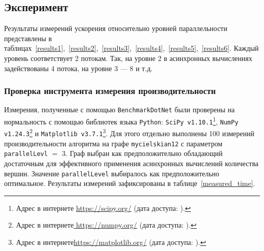 \subsection{Эксперимент}
\noindent Результаты измерений ускорения относительно уровней параллельности представлены в таблицах~\ref{results1},~\ref{results2},~\ref{results3},~\ref{results4},~\ref{results5},~\ref{results6}. Каждый уровень соответствует 2 потокам. Так, на уровне 2 в асинхронных вычислениях задействованы 4 потока, на уровне 3 --- 8 и т.д. 

\subsubsection*{Проверка инструмента измерения производительности}
\noindent  Измерения, полученные с помощью \texttt{BenchmarkDotNet} были проверены на нормальность с помощью библиотек языка \texttt{Python}: \texttt{SciPy v1.10.1}\footnote{Адрес в интернете \url{https://scipy.org/} (дата доступа:   ).}, \texttt{NumPy v1.24.3}\footnote{Адрес в интернете\url{ https://numpy.org/} (дата доступа:   ).} и \texttt{Matplotlib v3.7.1}\footnote{Адрес в интернете\url{https://matplotlib.org/} (дата доступа: ).}. Для этого отдельно выполнены 100 измерений производительности алгоритма на графе \texttt{mycielskian12} с параметром \texttt{parallelLevl} $=$ 3. Граф выбран как предположительно обладающий достаточным для эффективного применения асинхронных вычислений количества вершин. Значение \texttt{parallelLevel} выбиралось как предположительно оптимальное. Результаты измерений зафиксированы в таблице~\ref{measured_time}.

